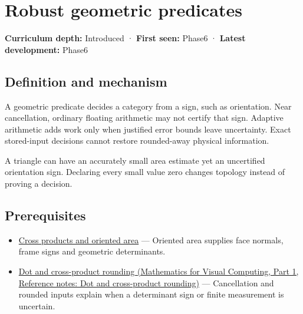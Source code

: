\hypertarget{appendix-341296fb3f64}{}\label{referencestart:appendix-341296fb3f64}
\section{Robust geometric predicates}\label{appendix-341296fb3f64-robust-geometric-predicates}

\hypertarget{appendix-341296fb3f64-robust-geometric-predicates}{}

\textbf{Curriculum depth:} Introduced · \textbf{First seen:} Phase6 · \textbf{Latest development:} Phase6

\begin{allmightroledefinition}

\subsection{Definition and mechanism}\label{appendix-341296fb3f64-definition-and-mechanism}

\hypertarget{appendix-341296fb3f64-definition-and-mechanism}{}

A geometric predicate decides a category from a sign, such as orientation. Near cancellation, ordinary floating arithmetic may not certify that sign. Adaptive arithmetic adds work only when justified error bounds leave uncertainty. Exact stored-input decisions cannot restore rounded-away physical information.

\end{allmightroledefinition}

A triangle can have an accurately small area estimate yet an uncertified orientation sign. Declaring every small value zero changes topology instead of proving a decision.

\subsection{Prerequisites}\label{appendix-341296fb3f64-prerequisites}

\hypertarget{appendix-341296fb3f64-prerequisites}{}

\begin{itemize}
\tightlist
\item
  \hyperref[appendix-2391db8052b1]{Cross products and oriented area} --- Oriented area supplies face normals, frame signs and geometric determinants.
\item
  \href{../02-Mathematics-for-Visual-Computing-P01/main.pdf\#appendix-5aef4f13483a}{Dot and cross-product rounding (Mathematics for Visual Computing, Part 1, Reference notes: Dot and cross-product rounding)} --- Cancellation and rounded inputs explain when a determinant sign or finite measurement is uncertain.
\end{itemize}

